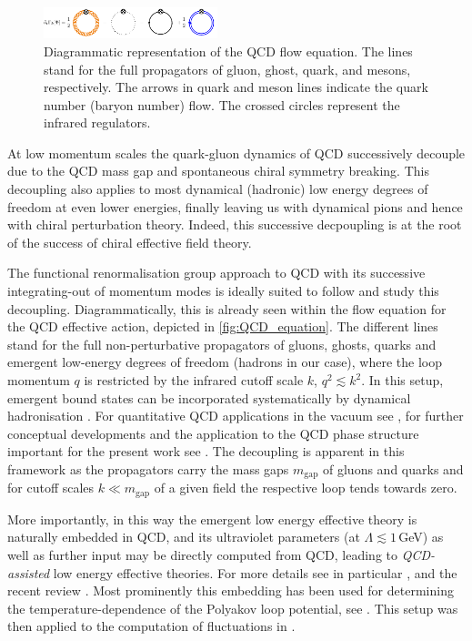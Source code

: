 \documentclass[%
reprint,
superscriptaddress,
showpacs,preprintnumbers,
amsmath,amssymb,
aps,
prd,
]{revtex4-1}
\begin{document}
%
\begin{figure}[t]
\includegraphics[width=0.45\textwidth]{QCD_equation}
\caption{Diagrammatic representation of the QCD flow equation. The lines stand for the full propagators of gluon, ghost, quark, and mesons, respectively. The arrows in quark and meson lines indicate the quark number (baryon number) flow. The crossed circles represent the infrared regulators.}\label{fig:QCD_equation}
\end{figure}
%
	
At low momentum scales the quark-gluon dynamics of QCD successively decouple due to the QCD mass gap and spontaneous chiral symmetry breaking. This decoupling also applies to most dynamical (hadronic) low energy degrees of freedom at even lower energies, finally leaving us with dynamical pions and hence with chiral perturbation theory. Indeed, this successive decpoupling is at the root of the success of chiral effective field theory. 
	
The functional renormalisation group approach to QCD with its successive integrating-out of momentum modes is ideally suited to follow and study this decoupling. Diagrammatically, this is already seen within the flow equation for the QCD effective action, depicted in \autoref{fig:QCD_equation}. The different lines stand for the full non-perturbative propagators of gluons, ghosts, quarks and emergent low-energy degrees of freedom (hadrons in our case), where the loop momentum $q$ is restricted by the infrared cutoff scale $k$, $q^2\lesssim k^2$. In this setup, emergent bound states can be incorporated systematically by dynamical hadronisation \cite{Gies:2001nw, Gies:2002hq, Pawlowski:2005xe, Floerchinger:2009uf}. For quantitative QCD applications in the vacuum see \cite{Braun:2014ata, Rennecke:2015eba, Mitter:2014wpa, Cyrol:2017ewj}, for further conceptual developments and the application to the QCD phase structure important for the present work see \cite{Fu:2019hdw}. The decoupling is apparent in this framework as the propagators carry the mass gaps $m_\textrm{gap}$ of gluons and quarks and for cutoff scales $k\ll m_\textrm{gap}$ of a given field the respective loop tends towards zero. 
	
More importantly, in this way the emergent low energy effective theory is naturally embedded in QCD, and its ultraviolet parameters (at $\Lambda\lesssim1$\,GeV) as well as further input may be directly computed from QCD, leading to \textit{QCD-assisted} low energy effective theories. For more details see in particular \cite{Fu:2019hdw}, and the recent review \cite{Dupuis:2020fhh}. Most prominently this embedding has been used for determining the temperature-dependence of the Polyakov loop potential, see \cite{Haas:2013qwp, Herbst:2013ufa}. This setup was then applied to the computation of fluctuations in \cite{Fu:2015amv, Fu:2015naa, Fu:2016tey,Wen:2018nkn,Yin:2019ebz}. 
	
\end{document}
